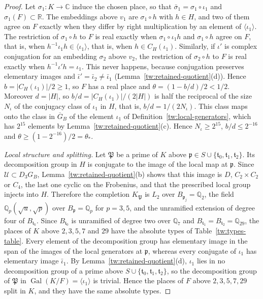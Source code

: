 \documentclass[11pt]{amsart}
\numberwithin{equation}{section}
\theoremstyle{definition}
\theoremstyle{remark}
\DeclareMathOperator{\Gal}{Gal}
\newcommand{\Q}{\mathbb Q}
\newcommand{\R}{\mathbb R}
\newcommand{\C}{\mathbb C}
\begin{document}
\begin{proof}
Let $\sigma_1\colon K\to\C$
induce the chosen place, so that $\bar\sigma_1=\sigma_1\circ\iota_1$ and
$\sigma_1(F)\subset\R$. The embeddings above $v_1$ are $\sigma_1\circ h$ with
$h\in H$, and two of them agree on $F$ exactly when they differ by right
multiplication by an element of $\langle\iota_1\rangle$. The restriction of
$\sigma_1\circ h$ to $F$ is real exactly when $\sigma_1\circ\iota_1h$ and
$\sigma_1\circ h$ agree on $F$, that is, when
$h^{-1}\iota_1h\in\langle\iota_1\rangle$, that is, when
$h\in C_H(\iota_1)$. Similarly, if $\iota'$ is complex conjugation for an
embedding $\sigma_2$ above $v_2$, the restriction of $\sigma_2\circ h$ to $F$
is real exactly when $h^{-1}\iota'h=\iota_1$. This never happens, because
conjugation preserves elementary images and $\bar\iota'=\bar\iota_2\ne\bar\iota_1$
(Lemma~\ref{tw:retained-quotient}(d)). Hence $b=|C_H(\iota_1)|/2\ge1$, so $F$
has a real place and $\theta=(1-b/d)/2<1/2$. Moreover $d=|H|$, so
$b/d=|C_H(\iota_1)|/(2|H|)$ is half the reciprocal of the size $N_\iota$ of
the conjugacy class of $\iota_1$ in $H$, that is, $b/d=1/(2N_\iota)$. This
class maps onto the class in $\overline G_B$ of the element $\iota_1$ of
Definition~\ref{tw:local-generators}, which has $2^{15}$
elements by Lemma~\ref{tw:retained-quotient}(c). Hence $N_\iota\ge2^{15}$,
$b/d\le2^{-16}$ and $\theta\ge(1-2^{-16})/2=\theta_*$.

\emph{Local structure and splitting.} Let $\mathfrak P$ be a prime of $K$
above $\mathfrak p\in S\cup\{\mathfrak t_0,\mathfrak t_1,\mathfrak t_2\}$. Its
decomposition group in $H$ is conjugate to the image of the local map at
$\mathfrak p$. Since $\mathcal U\subset D_3G_B$, Lemma~\ref{tw:retained-quotient}(b)
shows that this image is $D$, $C_2\times C_2$ or $C_4$, the last one cyclic on
the Frobenius, and that the prescribed local group injects into $H$.
Therefore the completion $K_{\mathfrak P}$ is $L_2$ over
$B_{\mathfrak p_j}=\Q_2$, the field $\Q_p(\sqrt u,\sqrt p)$ over
$B_{\mathfrak p}=\Q_p$ for $p=3,5$, and the unramified extension of degree
four of $B_{\mathfrak t_k}$. Since $B_{\mathfrak t_0}$ is unramified of
degree two over $\Q_7$ and $B_{\mathfrak t_1}=B_{\mathfrak t_2}=\Q_{29}$, the
places of $K$ above $2,3,5,7$ and $29$ have the absolute types of
Table~\ref{tw:types-table}. Every element of
the decomposition group has elementary image in the span of the images of the
local generators at $\mathfrak p$, whereas every conjugate of $\iota_1$ has
elementary image $\bar\iota_1$. By Lemma~\ref{tw:retained-quotient}(d),
$\iota_1$ lies in no decomposition group of a prime above
$S\cup\{\mathfrak t_0,\mathfrak t_1,\mathfrak t_2\}$, so the decomposition
group of $\mathfrak P$ in $\Gal(K/F)=\langle\iota_1\rangle$ is trivial. Hence
the places of $F$ above $2,3,5,7,29$ split in $K$, and they have the same
absolute types.


\end{proof}
\end{document}
